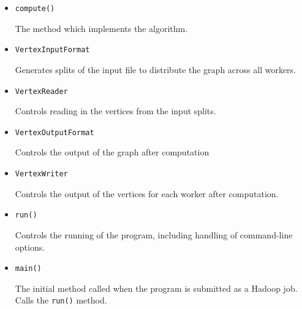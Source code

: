 \begin{itemize}

    \item {\tt compute()}

    \begin{description}
        The method which implements the algorithm.
    \end{description}
    
    \item {\tt VertexInputFormat}

    \begin{description}
        Generates splits of the input file to distribute the graph across all workers.
    \end{description}
    
    \item {\tt VertexReader}

    \begin{description}
        Controls reading in the vertices from the input splits.
    \end{description}
    
    \item {\tt VertexOutputFormat}

    \begin{description}
        Controls the output of the graph after computation
    \end{description}
    
    \item {\tt VertexWriter}

    \begin{description}
        Controls the output of the vertices for each worker after computation.
    \end{description}
    
    \item {\tt run()}

    \begin{description}
        Controls the running of the program, including handling of command-line options.
    \end{description}
    
    \item {\tt main()}

    \begin{description}
        The initial method called when the program is submitted as a Hadoop job. Calls the {\tt run()} method.
    \end{description}
    
\end{itemize}

